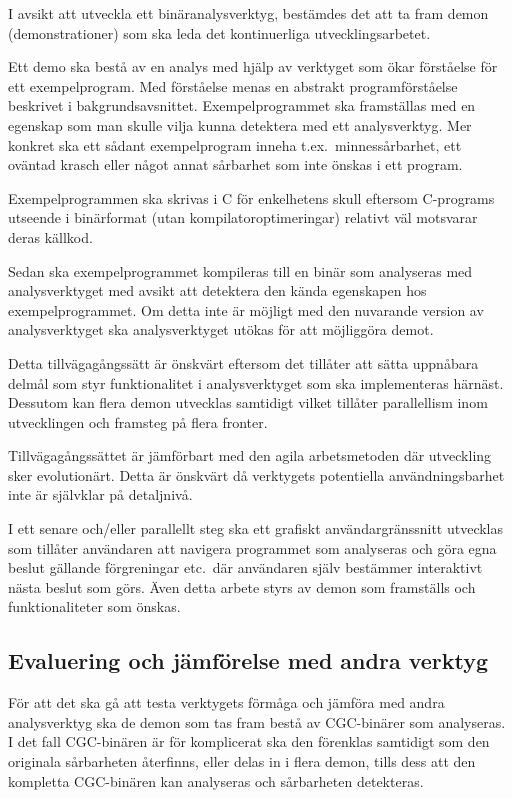 
I avsikt att utveckla ett binäranalysverktyg, bestämdes det att ta fram demon
(demonstrationer) som ska leda det kontinuerliga utvecklingsarbetet.

Ett demo ska bestå av en analys med hjälp av verktyget som ökar förståelse för
ett exempelprogram. Med förståelse menas en abstrakt programförståelse
beskrivet i bakgrundsavsnittet. Exempelprogrammet ska framställas med en
egenskap som man skulle vilja kunna detektera med ett analysverktyg. Mer
konkret ska ett sådant exempelprogram inneha t.ex.\ minnessårbarhet, ett oväntad
krasch eller något annat sårbarhet som inte önskas i ett program.

Exempelprogrammen ska skrivas i C för enkelhetens skull eftersom
C-programs utseende i binärformat (utan kompilatoroptimeringar)
relativt väl motsvarar deras källkod.

Sedan ska exempelprogrammet kompileras till en binär som analyseras med
analysverktyget med avsikt att detektera den kända egenskapen hos
exempelprogrammet. Om detta inte är möjligt med den nuvarande version av
analysverktyget ska analysverktyget utökas för att möjliggöra demot.

Detta tillvägagångssätt är önskvärt eftersom det tillåter att sätta uppnåbara
delmål som styr funktionalitet i analysverktyget som ska implementeras härnäst.
Dessutom kan flera demon utvecklas samtidigt vilket tillåter parallellism inom
utvecklingen och framsteg på flera fronter.

Tillvägagångssättet är jämförbart med den agila arbetsmetoden där utveckling sker
evolutionärt. Detta är önskvärt då verktygets potentiella
användningsbarhet inte är självklar på detaljnivå.

I ett senare och/eller parallellt steg ska ett grafiskt användargränssnitt
utvecklas som tillåter användaren att navigera programmet som analyseras och
göra egna beslut gällande förgreningar etc.\ där användaren själv bestämmer
interaktivt nästa beslut som görs. Även detta arbete styrs av demon som
framställs och funktionaliteter som önskas.

\subsection{Evaluering och jämförelse med andra verktyg}

För att det ska gå att testa verktygets förmåga och jämföra med andra
analysverktyg ska de demon som tas fram bestå av CGC-binärer som analyseras. I
det fall CGC-binären är för komplicerat ska den förenklas samtidigt som den
originala sårbarheten återfinns, eller delas in i flera demon, tills dess att
den kompletta CGC-binären kan analyseras och sårbarheten detekteras.

